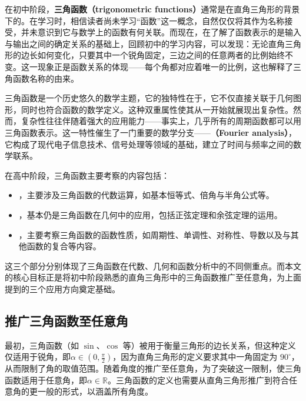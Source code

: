 \begin{issues}
\issueDraft
\end{issues}

在初中阶段，\textbf{三角函数（trigonometric functions）}通常是在直角三角形的背景下的。在学习时，相信读者尚未学习“函数”这一概念，自然仅仅将其作为名称接受，并未意识到它与数学上的函数有何关联。而现在，在了解了函数表示的是输入与输出之间的确定关系的基础上，回顾初中的学习内容，可以发现：无论直角三角形的边长如何变化，只要其中一个锐角固定，三边之间的任意两者的比例始终不变。这一现象正是函数关系的体现——每个角都对应着唯一的比例，这也解释了三角函数名称的由来。

三角函数是一个历史悠久的数学主题，它的独特性在于，它不仅直接关联于几何图形，同时也符合函数的数学定义。这种双重属性使其从一开始就展现出复杂性。然而，复杂性往往伴随着强大的应用能力——事实上，几乎所有的周期函数都可以用三角函数表示。这一特性催生了一门重要的数学分支——\textbf{（Fourier analysis）}，它构成了现代电子信息技术、信号处理等领域的基础，建立了时间与频率之间的数学联系。

在高中阶段，三角函数主要考察的内容包括：

\begin{itemize}
\item {}，主要涉及三角函数的代数运算，如基本恒等式、倍角与半角公式等。
\item {}，基本仍是三角函数在几何中的应用，包括正弦定理和余弦定理的运用。
\item {}，主要考察三角函数的函数性质，如周期性、单调性、对称性、导数以及与其他函数的复合等内容。
\end{itemize}

这三个部分分别体现了三角函数在代数、几何和函数分析中的不同侧重点。而本文的核心目标正是将初中阶段熟悉的直角三角形中的三角函数推广至任意角，为上面提到的三个应用方向奠定基础。

\subsection{推广三角函数至任意角}

最初，三角函数（如 $\sin$、$\cos$ 等）被用于衡量三角形的边长关系，但这种定义仅适用于锐角，即$\displaystyle\alpha\in(0,\frac{\pi}{2})$，因为直角三角形的定义要求其中一角固定为 $90^\circ$，从而限制了角的取值范围。随着角度的推广至任意角，为了突破这一限制，使三角函数适用于任意角，即$\alpha\in\mathbb{R}$。三角函数的定义也需要从直角三角形推广到符合任意角的更一般的形式，以涵盖所有角度。

